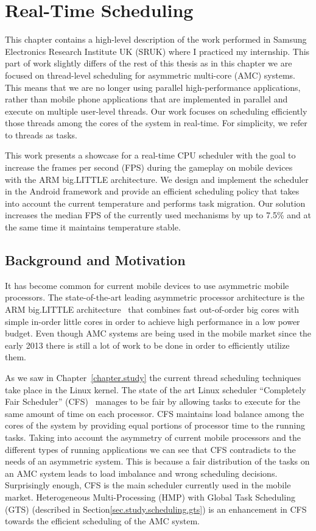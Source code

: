 \chapter{Real-Time Scheduling}
\label{chapter.RTS}
This chapter contains a high-level description of the work performed in Samsung Electronics Research Institute UK (SRUK) where I practiced my internship.
This part of work slightly differs of the rest of this thesis as in this chapter we are focused on thread-level scheduling for asymmetric multi-core (AMC) systems.
This means that we are no longer using parallel high-performance applications, rather than mobile phone applications that are implemented in parallel and execute on multiple user-level threads.
Our work focuses on scheduling efficiently those threads among the cores of the system in real-time.
For simplicity, we refer to threads as tasks.

This work presents a showcase for a real-time CPU scheduler with the goal to increase the frames per second (FPS) during the gameplay on mobile devices with the ARM big.LITTLE architecture. 
We design and implement the scheduler in the Android framework and provide an efficient scheduling policy that takes into account the current temperature and performs task migration. 
Our solution increases the median FPS of the currently used mechanisms by up to 7.5\% and at the same time it maintains temperature stable. 
\newpage

\section{Background and Motivation}
It has become common for current mobile devices to use asymmetric mobile processors. 
The state-of-the-art leading asymmetric processor architecture is the ARM big.LITTLE architecture~\cite{Greenhalgh2011} that combines fast out-of-order big cores with simple in-order little cores in order to achieve high performance in a low power budget. 
Even though AMC systems are being used in the mobile market since the early 2013 there is still a lot of work to be done in order to efficiently utilize them.

As we saw in Chapter~\ref{chapter.study} the current thread scheduling techniques take place in the Linux kernel.
The state of the art Linux scheduler “Completely Fair Scheduler” (CFS)~\cite{CFS} manages to be fair by allowing tasks to execute for the same amount of time on each processor. 
CFS maintains load balance among the cores of the system by providing equal portions of processor time to the running tasks. 
Taking into account the asymmetry of current mobile processors and the different types of running applications we can see that CFS contradicts to the needs of an asymmetric system.
This is because a fair distribution of the tasks on an AMC system leads to load imbalance and wrong scheduling decisions. 
Surprisingly enough, CFS is the main scheduler currently used in the mobile market.
Heterogeneous Multi-Processing (HMP) with Global Task Scheduling (GTS) (described in Section\ref{sec.study.scheduling.gts}) is an enhancement in CFS towards the efficient scheduling of the AMC system. 

